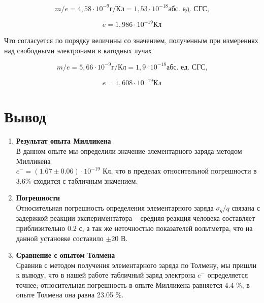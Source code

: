 \documentclass{lab}
\begin{document}
\begin{equation}
    m/e = 4,58 \cdot 10^{-9} \text{г/Кл} = 1,53 \cdot 10^{-18} \text{абс. ед. СГС,}
\end{equation}

\begin{equation}
    e = 1,986\cdot 10^{-19} \text{Кл}
\end{equation}

Что согласуется по порядку величины со значением, полученным при измерениях над свободными электронами в катодных лучах

\begin{equation}
    m/e = 5,66 \cdot 10^{-9} \text{г/Кл}  = 1,9 \cdot 10^{-18} \text{абс. ед. СГС,}
\end{equation}

\begin{equation}
    e = 1,608\cdot 10^{-19} \text{Кл}
\end{equation}

\section{Вывод}
\begin{enumerate}
    \item \textbf{Результат опыта Милликена}
    \\
В данном опыте мы определили значение элементарного заряда методом Милликена \\ $e^{-} = (1.67 \pm 0.06)\cdot10^{-19} \text{ Кл}$, что в пределах относительной погрешности в 3.6\% сходится с табличным значением.  
    \item \textbf{Погрешности}
    \\
Относительная погрешность определения элементарного заряда $\sigma_q/q$ связана с задержкой реакции экспериментатора -- средняя реакция человека составляет приблизительно 0.2 с, а так же неточностью показателей вольтметра, что на данной установке составило $\pm 20 \text{ В}$.  
    \item \textbf{Сравнение с опытом Толмена}
    \\
Сравнив с методом получения элементарного заряда по Толмену, мы пришли к выводу, что в нашей работе табличный заряд электрона $e^{-}$ определяется точнее; относительная погрешность в опыте Милликена равняется 4.4 \%, в опыте Толмена она равна 23.05 \%.
\end{enumerate}
\end{document}
